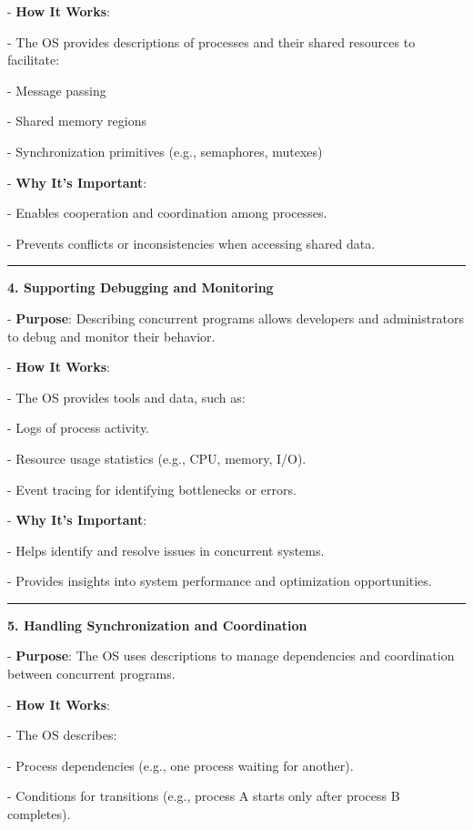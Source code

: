 \documentclass[a4paper]{book}
\begin{document}
   - \textbf{How It Works}:
     
     - The OS provides descriptions of processes and their shared resources to facilitate:
       
       - Message passing
       
       - Shared memory regions
       
       - Synchronization primitives (e.g., semaphores, mutexes)
   
   - \textbf{Why It's Important}:
     
     - Enables cooperation and coordination among processes.
     
     - Prevents conflicts or inconsistencies when accessing shared data.
     
\rule{0.75\textwidth}{0.5pt}

\textbf{4. Supporting Debugging and Monitoring}

   - \textbf{Purpose}: Describing concurrent programs allows developers and administrators to debug and monitor their behavior.
   
   - \textbf{How It Works}:
     
     - The OS provides tools and data, such as:
       
       - Logs of process activity.
       
       - Resource usage statistics (e.g., CPU, memory, I/O).
       
       - Event tracing for identifying bottlenecks or errors.
   
   - \textbf{Why It's Important}:
     
     - Helps identify and resolve issues in concurrent systems.
     
     - Provides insights into system performance and optimization opportunities.

\rule{0.75\textwidth}{0.5pt}

\textbf{5. Handling Synchronization and Coordination}

   - \textbf{Purpose}: The OS uses descriptions to manage dependencies and coordination between concurrent programs.
   
   - \textbf{How It Works}:
     
     - The OS describes:
       
       - Process dependencies (e.g., one process waiting for another).
       
       - Conditions for transitions (e.g., process A starts only after process B completes).
  
\end{document}

